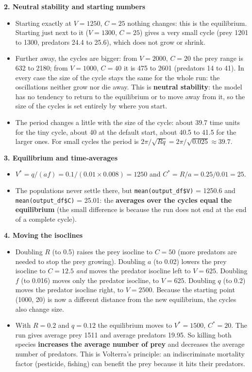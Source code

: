 \documentclass[
  a4paper]{book}
\providecommand{\tightlist}{%
  \setlength{\itemsep}{0pt}\setlength{\parskip}{0pt}}
\begin{document}
\textbf{2. Neutral stability and starting numbers}

\begin{itemize}
\tightlist
\item
  Starting exactly at \(V = 1250\), \(C = 25\) nothing changes: this is the equilibrium. Starting just next to it (\(V = 1300\), \(C = 25\)) gives a very small cycle (prey 1201 to 1300, predators 24.4 to 25.6), which does not grow or shrink.
\item
  Further away, the cycles are bigger: from \(V = 2000\), \(C = 20\) the prey range is 632 to 2180; from \(V = 1000\), \(C = 40\) it is 475 to 2601 (predators 14 to 41). In every case the size of the cycle stays the same for the whole run: the oscillations neither grow nor die away. This is \textbf{neutral stability}: the model has no tendency to return to the equilibrium or to move away from it, so the size of the cycles is set entirely by where you start.
\item
  The period changes a little with the size of the cycle: about 39.7 time units for the tiny cycle, about 40 at the default start, about 40.5 to 41.5 for the larger ones. For small cycles the period is \(2\pi/\sqrt{Rq} = 2\pi/\sqrt{0.025} \approx 39.7\).
\end{itemize}

\textbf{3. Equilibrium and time-averages}

\begin{itemize}
\tightlist
\item
  \(V^* = q/(af) = 0.1/(0.01 \times 0.008) = 1250\) and \(C^* = R/a = 0.25/0.01 = 25\).
\item
  The populations never settle there, but \texttt{mean(output\_df\$V)} = 1250.6 and \texttt{mean(output\_df\$C)} = 25.01: the \textbf{averages over the cycles equal the equilibrium} (the small difference is because the run does not end at the end of a complete cycle).
\end{itemize}

\textbf{4. Moving the isoclines}

\begin{itemize}
\tightlist
\item
  Doubling \(R\) (to 0.5) raises the prey isocline to \(C = 50\) (more predators are needed to stop the prey growing). Doubling \(a\) (to 0.02) lowers the prey isocline to \(C = 12.5\) \emph{and} moves the predator isocline left to \(V = 625\). Doubling \(f\) (to 0.016) moves only the predator isocline, to \(V = 625\). Doubling \(q\) (to 0.2) moves the predator isocline right, to \(V = 2500\). Because the starting point (1000, 20) is now a different distance from the new equilibrium, the cycles also change size.
\item
  With \(R = 0.2\) and \(q = 0.12\) the equilibrium moves to \(V^* = 1500\), \(C^* = 20\). The run gives average prey 1511 and average predators 19.95. So killing both species \textbf{increases the average number of prey} and decreases the average number of predators. This is Volterra's principle: an indiscriminate mortality factor (pesticide, fishing) can benefit the prey because it hits their predators.
\end{itemize}
\end{document}
